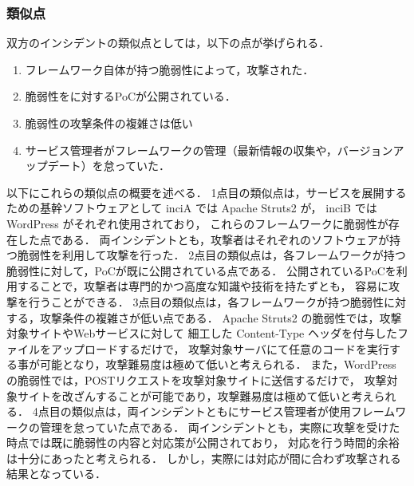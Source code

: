 \documentclass[uplatex]{jsarticle}
\begin{document}
\subsubsection*{類似点}
双方のインシデントの類似点としては，以下の点が挙げられる．
\begin{enumerate}
    \item フレームワーク自体が持つ脆弱性によって，攻撃された．
    \item 脆弱性をに対するPoCが公開されている．
    \item 脆弱性の攻撃条件の複雑さは低い
    \item サービス管理者がフレームワークの管理（最新情報の収集や，バージョンアップデート）を怠っていた．
\end{enumerate}
以下にこれらの類似点の概要を述べる．
1点目の類似点は，サービスを展開するための基幹ソフトウェアとして inciA では Apache Struts2 が，
inciB では WordPress がそれぞれ使用されており，
これらのフレームワークに脆弱性が存在した点である．
両インシデントとも，攻撃者はそれぞれのソフトウェアが持つ脆弱性を利用して攻撃を行った．
2点目の類似点は，各フレームワークが持つ脆弱性に対して，PoCが既に公開されている点である．
公開されているPoCを利用することで，攻撃者は専門的かつ高度な知識や技術を持たずとも，
容易に攻撃を行うことができる．
3点目の類似点は，各フレームワークが持つ脆弱性に対する，攻撃条件の複雑さが低い点である．
Apache Struts2 の脆弱性では，攻撃対象サイトやWebサービスに対して
細工した Content-Type ヘッダを付与したファイルをアップロードするだけで，
攻撃対象サーバにて任意のコードを実行する事が可能となり，攻撃難易度は極めて低いと考えられる．
また，WordPress の脆弱性では，POSTリクエストを攻撃対象サイトに送信するだけで，
攻撃対象サイトを改ざんすることが可能であり，攻撃難易度は極めて低いと考えられる．
4点目の類似点は，両インシデントともにサービス管理者が使用フレームワークの管理を怠っていた点である．
両インシデントとも，実際に攻撃を受けた時点では既に脆弱性の内容と対応策が公開されており，
対応を行う時間的余裕は十分にあったと考えられる．
しかし，実際には対応が間に合わず攻撃される結果となっている．
\end{document}
